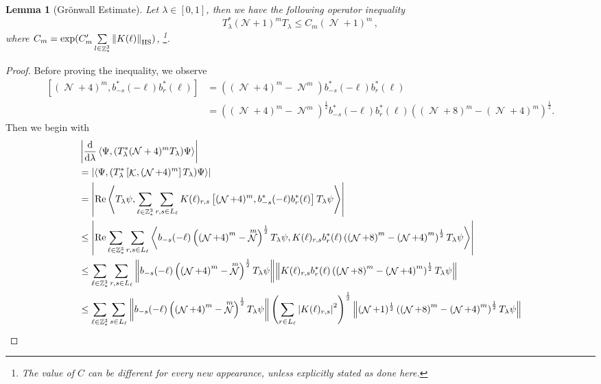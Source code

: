 \documentclass[sn-mathphys, Numbered ,a4paper]{sn-jnl}%
\DeclareMathOperator{\Z}{\mathbb{Z}}
\DeclareMathOperator{\KK}{\mathcal{K}}
\DeclareMathOperator{\NN}{\mathcal{N}}
\newcommand{\half}{\frac{1}{2}}
\newcommand{\eva}[1]{\left\langle #1 \right\rangle}
\newcommand{\di}{\mathrm{d}}
\theoremstyle{plain}
\newtheorem{lemma}[theorem]{Lemma}
\theoremstyle{definition}
\theoremstyle{remark}
\theoremstyle{plain}
\theoremstyle{definition}
\theoremstyle{remark}
\begin{document}
\begin{lemma}[Gr\"onwall Estimate]\label{lem:gronNest}
    Let $\lambda\in [0,1]$, then we have the following operator inequality
    \begin{equation}\label{eq:gronest}
     T^*_{\lambda}(\mathcal{N} +1)^m T_{\lambda} \leq C_m (\NN+1)^m\, ,    
    \end{equation}
    where $C_m = \mathrm{exp}(C'_m\sum\limits_{l\in \Z^3_*} \norm{K(\ell)}_{\mathrm{HS}}) $,
    \footnote{The value of $C$ can be different for every new appearance, unless explicitly stated as done here.}.
\end{lemma}
\begin{proof}
Before proving the inequality, we observe
\begin{align}
	\left[(\NN+4)^m, b^*_{-s}(-\ell)b^*_{r}(\ell)\right] &= \left( (\NN+4)^m - \NN^m \right) b^*_{-s}(-\ell)b^*_{r}(\ell) \nonumber \\
	&= \left( \left(\NN+4\right)^m - \NN^m \right)^\half b^*_{-s}(-\ell)b^*_{r}(\ell) \left( \left(\NN+8\right)^m - \left(\NN+4\right)^m \right)^\half.
\end{align}
Then we begin with
\begin{align}
	&\left|\frac{\di}{\di\lambda}\eva{\Psi, (T^*_{\lambda}(\mathcal{N}+4)^m T_{\lambda})\Psi }\right| \nonumber\\ 
	&= \left| \eva{\Psi,( T^*_{\lambda} \left[\KK, (\NN+4)^m\right] T_{\lambda}) \Psi}\right|\nonumber\\
	&= \abs{\mathrm{Re}\eva{ T_{\lambda}\psi, \sum\limits_{\ell\in \mathbb{Z}^3_*}\sum\limits_{r,s\in L_\ell}K(\ell)_{r,s}\left[ (\NN+4)^m, b^*_{-s}(-\ell)b^*_{r}(\ell) \right]T_{\lambda} \psi }}\nonumber\\
	&\leq \abs{\mathrm{Re}\sum\limits_{\ell\in \mathbb{Z}^3_*}\sum\limits_{r,s\in L_\ell} \eva{  b_{-s}(-\ell) \left( \left(\NN+4\right)^m - \NN^m \right)^\half T_{\lambda} \psi, K(\ell)_{r,s} b^*_{r}(\ell) \left( \left(\NN+8\right)^m - \left(\NN+4\right)^m \right)^\half T_{\lambda}\psi }}\nonumber\\
	&\leq \sum\limits_{\ell\in \mathbb{Z}^3_*}\sum\limits_{r,s\in L_\ell} \norm{ b_{-s}(-\ell) \left( \left(\NN+4\right)^m - \NN^m \right)^\half T_{\lambda}\psi} \norm {K(\ell)_{r,s} b^*_{r}(\ell) \left( \left(\NN+8\right)^m - \left(\NN+4\right)^m \right)^\half T_{\lambda}\psi} \nonumber\\
	&\leq \sum\limits_{\ell\in \mathbb{Z}^3_*}\sum\limits_{s\in L_\ell} \norm{  b_{-s}(-\ell) \left( \left(\NN+4\right)^m - \NN^m \right)^\half T_{\lambda}\psi} \left(\sum\limits_{r\in L_\ell} \abs{K(\ell)_{r,s}}^2 \right)^\half \norm { (\NN+1)^\half \left( \left(\NN+8\right)^m - \left(\NN+4\right)^m \right)^\half T_{\lambda}\psi} \nonumber\\

\end{align}
\end{proof}
\end{document}
